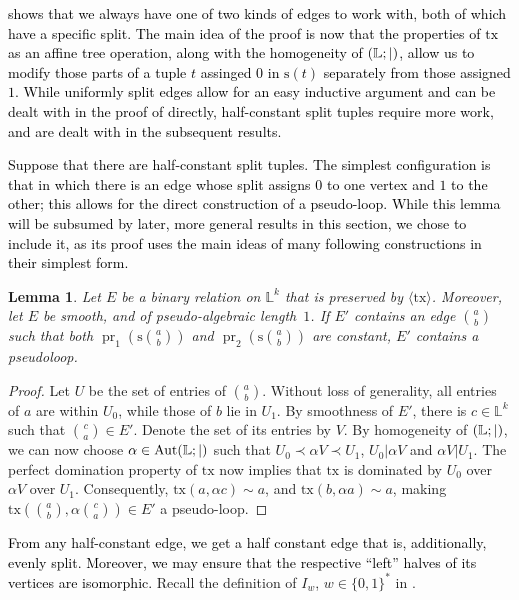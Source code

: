 \documentclass[a4paper,reqno, cleveref]{amsart}
\newtheorem{lemma}[theorem]{Lemma}
\newcommand{\struct}[1]{\mathbb{#1}}
\newcommand{\s}{\ensuremath{\mathrm{s}}\xspace}
\DeclareMathOperator{\pr}{pr}
\DeclareMathOperator{\Aut}{Aut}
\newcommand{\sL}{\mathbb L}
\newcommand{\bin}{E}
\newcommand{\gen}[1]{\langle#1\rangle}
\newcommand{\Phylo}[1]{\ensuremath{(\struct{L};|)}#1}
\newcommand{\tx}{\ensuremath{\mathrm{tx}}\xspace}
\newcommand{\pal}{pseudo-algebraic length~$1$}
\newcommand\jo[1]{\textcolor{black}{#1}} %
\newcommand\mo[1]{\textcolor{black}{#1}} %
\begin{document}
\mo{ shows that we always have one of two kinds of edges to work with, both of which have a specific split. 
%
The main idea of the proof is now that the properties of $\tx$ as an affine tree operation, along with the homogeneity of $\Phylo$, allow us to modify those parts of a tuple $t$ assinged $0$ in $\s(t)$ separately from those assigned $1$. 
%
While uniformly split edges allow for an easy inductive argument and can be dealt with in the proof of \Cref{phylo:lemma:graph:even} directly, half-constant split tuples require more work, and are dealt with in the subsequent results.} 

\mo{
Suppose that there are half-constant split tuples. The simplest configuration is that in which there is an edge whose split assigns $0$ to one vertex and $1$ to the other; this allows for the direct construction of a pseudo-loop. 
While this lemma will be subsumed by later, more general results in this section, we chose to include it, as its proof uses the main ideas of many following constructions in their simplest form.
}

\begin{lemma}\label{phylo:graph:lemma:easy_case}
    Let $\bin$ be a binary relation on $\sL^k$ that is preserved by $\gen{\tx}$. 
    Moreover, let $\bin$ be smooth, and of \pal.
    If $\bin'$ contains an edge $\binom{a}{b}$ such that both $\pr_1(\s\binom{a}{b})$ and $\pr_2(\s\binom{a}{b})$ are constant, $\bin'$ contains a pseudoloop.
\end{lemma}

\begin{proof}%
    Let $U$ be the set of entries of $\binom{a}{b}$.
    Without loss of generality, all entries of $a$ are within $U_0$, while those of $b$ lie in $U_1$. 
    By smoothness of $\bin'$, there is $c\in \sL^k$ such that $\binom{c}{a}\in\bin'$. Denote the set of its entries by $V$. By homogeneity of $\Phylo$, we can now choose $\alpha\in\Aut\Phylo$ such that $U_0\prec \alpha V\prec U_1$, $U_0|\alpha V$ and $\alpha V|U_1$.
    The perfect domination property of $\tx$ now implies that $\tx$ is dominated by $U_0$ over $\alpha V$ over $U_1$. 
    Consequently, $\tx(a,\alpha c)\sim a$, and $\tx(b,\alpha a)\sim a$, making $\tx(\binom{a}{b},\alpha\binom{c}{a})\in\bin'$ a pseudo-loop.
\end{proof}

\jo{From any half-constant edge, we get a half constant edge that is, additionally, evenly split. Moreover, we may ensure that the respective ``left'' halves of its vertices are isomorphic.}
%
Recall the definition of $I_w$, $w\in\{0,1\}^*$ in .
\end{document}
